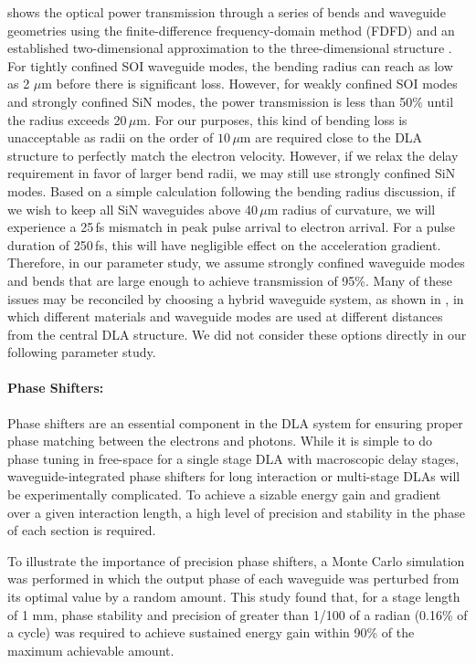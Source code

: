  shows the optical power transmission through a series of bends and waveguide geometries using the finite-difference frequency-domain method (FDFD) \cite{shin2012choice} and an established two-dimensional approximation to the three-dimensional structure \cite{smotrova2005cold}.
For tightly confined SOI waveguide modes, the bending radius can reach as low as 2 $\mu$m before there is significant loss.
However, for weakly confined SOI modes and strongly confined SiN modes, the power transmission is less than 50$\%$ until the radius exceeds 20\,$\mu$m.
For our purposes, this kind of bending loss is unacceptable as radii on the order of $10$\,$\mu$m are required close to the DLA structure to perfectly match the electron velocity.
However, if we relax the delay requirement in favor of larger bend radii, we may still use strongly confined SiN modes.
Based on a simple calculation following the bending radius discussion, if we wish to keep all SiN waveguides above 40\,$\mu$m radius of curvature, we will experience a 25\,fs mismatch in peak pulse arrival to electron arrival.
For a pulse duration of 250\,fs, this will have negligible effect on the acceleration gradient.
Therefore, in our parameter study, we assume strongly confined waveguide modes and bends that are large enough to achieve transmission of 95\%.
Many of these issues may be reconciled by choosing a hybrid waveguide system, as shown in , in which different materials and waveguide modes are used at different distances from the central DLA structure.
We did not consider these options directly in our following parameter study.

\paragraph{Phase Shifters:}

Phase shifters are an essential component in the DLA system for ensuring proper phase matching between the electrons and photons.
While it is simple to do phase tuning in free-space for a single stage DLA with macroscopic delay stages, waveguide-integrated phase shifters for long interaction or multi-stage DLAs will be experimentally complicated.
To achieve a sizable energy gain and gradient over a given interaction length, a high level of precision and stability in the phase of each section is required.

To illustrate the importance of precision phase shifters, a Monte Carlo simulation was performed in which the output phase of each waveguide was perturbed from its optimal value by a random amount.
This study found that, for a stage length of 1 mm, phase stability and precision of greater than 1/100 of a radian (0.16\% of a cycle) was required to achieve sustained energy gain within 90\% of the maximum achievable amount.

